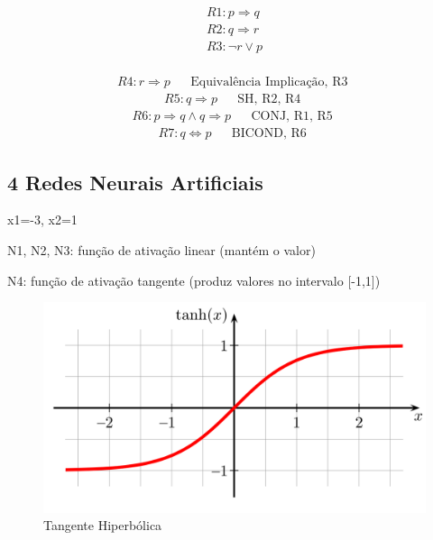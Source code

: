 



\begin{equation*}
    \begin{gathered}
        R1: p \Rightarrow q \\
        R2: q \Rightarrow r \\
        R3: \neg{r} \lor p \\
    \end{gathered}
\end{equation*}


\begin{align*}
    R4: r \Rightarrow p && \text{Equivalência Implicação, R3 }
\end{align*}
\begin{align*}
    R5: q \Rightarrow p && \text{SH, R2, R4 }
\end{align*}
\begin{align*}
    R6: p \Rightarrow q \land q \Rightarrow p && \text{CONJ, R1, R5 }
\end{align*}
\begin{align*}
    R7: q \Leftrightarrow p && \text{BICOND, R6 }
\end{align*}


\subsection*{\textbf{4 Redes Neurais Artificiais}}

x1=-3, x2=1

N1, N2, N3: função de ativação linear (mantém o valor)

N4: função de ativação tangente (produz valores no intervalo [-1,1])

\begin{figure}[!h]
\centering
\includegraphics[width=0.6\linewidth]{apendices/fig/1_IAA001_5.png}
\caption{Tangente Hiperbólica}
\label{tanh}
\end{figure}

